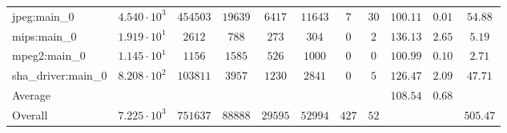 \begin{tabular}{|l|c|c|c|c|c|c|c|c|c|c|}
jpeg:main\_0            & $ 4.540 \cdot 10^{3}  $ & $ 454503 $ & $ 19639 $ & $ 6417  $ & $ 11643 $ & $ 7   $ & $ 30 $ & $ 100.11      $ & $ 0.01    $ & $ 54.88   $ \\
mips:main\_0            & $ 1.919 \cdot 10^{1}  $ & $ 2612   $ & $ 788   $ & $ 273   $ & $ 304   $ & $ 0   $ & $ 2  $ & $ 136.13      $ & $ 2.65    $ & $ 5.19    $ \\
mpeg2:main\_0           & $ 1.145 \cdot 10^{1}  $ & $ 1156   $ & $ 1585  $ & $ 526   $ & $ 1000  $ & $ 0   $ & $ 0  $ & $ 100.99      $ & $ 0.10    $ & $ 2.71    $ \\
sha\_driver:main\_0     & $ 8.208 \cdot 10^{2}  $ & $ 103811 $ & $ 3957  $ & $ 1230  $ & $ 2841  $ & $ 0   $ & $ 5  $ & $ 126.47      $ & $ 2.09    $ & $ 47.71   $ \\
\hline
Average                 & $                     $ & $        $ & $       $ & $       $ & $       $ & $     $ & $    $ & $ 108.54      $ & $ 0.68    $ & $         $ \\
\hline
Overall                 & $ 7.225 \cdot 10^{3}  $ & $ 751637 $ & $ 88888 $ & $ 29595 $ & $ 52994 $ & $ 427 $ & $ 52 $ & $             $ & $         $ & $ 505.47  $ \\
\hline
\end{tabular}
